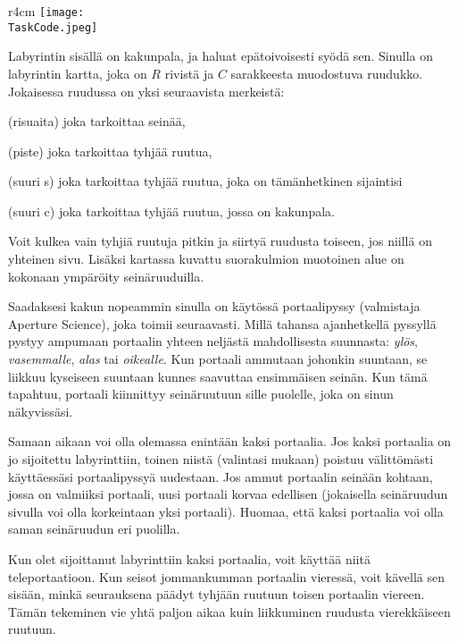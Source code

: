 \documentclass{boi2014-fi}
\renewcommand{\TaskCode}{portals}
\newcommand{\constant}[1]{{\tt #1}}
\begin{document}
    \begin{wrapfigure}[4]{r}{4cm}
        \vspace{-24pt}
\texttt{[image: \\TaskCode.jpeg]}
\end{wrapfigure}

    Labyrintin sisällä on kakunpala, ja haluat epätoivoisesti syödä sen.
    Sinulla on labyrintin kartta, joka on $R$ rivistä ja $C$ sarakkeesta
    muodostuva ruudukko.
    Jokaisessa ruudussa on yksi seuraavista merkeistä:

    \begin{description}[itemindent=1pt]
     \item[\constant{\#}] (risuaita) joka tarkoittaa seinää,
        \item[\constant{.}] (piste) joka tarkoittaa tyhjää ruutua,
        \item[\constant{S}] (suuri s) joka tarkoittaa tyhjää ruutua,
        joka on tämänhetkinen sijaintisi
        \item[\constant{C}] (suuri c) joka tarkoittaa tyhjää ruutua,
        jossa on kakunpala.
    \end{description}

    Voit kulkea vain tyhjiä ruutuja pitkin ja siirtyä ruudusta toiseen,
    jos niillä on yhteinen sivu. Lisäksi kartassa kuvattu suorakulmion
    muotoinen alue on kokonaan ympäröity seinäruuduilla.

    Saadaksesi kakun nopeammin sinulla on käytössä portaalipyssy
    (valmistaja Aperture Science\texttrademark{}), joka toimii seuraavasti.
    Millä tahansa ajanhetkellä pyssyllä pystyy ampumaan portaalin
    yhteen neljästä mahdollisesta suunnasta: \emph{ylös}, \emph{vasemmalle},
    \emph{alas} tai \emph{oikealle}. Kun portaali ammutaan johonkin suuntaan,
    se liikkuu kyseiseen suuntaan kunnes saavuttaa ensimmäisen seinän.
    Kun tämä tapahtuu, portaali kiinnittyy seinäruutuun sille puolelle,
    joka on sinun näkyvissäsi.

    Samaan aikaan voi olla olemassa enintään kaksi portaalia.
    Jos kaksi portaalia on jo sijoitettu labyrinttiin,
    toinen niistä (valintasi mukaan) poistuu välittömästi
    käyttäessäsi portaalipyssyä uudestaan.
    Jos ammut portaalin seinään kohtaan, jossa on valmiiksi portaali,
    uusi portaali korvaa edellisen (jokaisella seinäruudun sivulla voi
    olla korkeintaan yksi portaali). Huomaa, että kaksi portaalia
    voi olla saman seinäruudun eri puolilla.

    Kun olet sijoittanut labyrinttiin kaksi portaalia,
    voit käyttää niitä teleportaatioon.
    Kun seisot jommankumman portaalin vieressä,
    voit kävellä sen sisään, minkä seurauksena päädyt
    tyhjään ruutuun toisen portaalin viereen.
    Tämän tekeminen vie yhtä paljon aikaa kuin liikkuminen
    ruudusta vierekkäiseen ruutuun.
\end{document}
